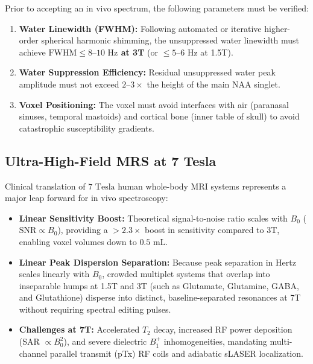 \documentclass[11pt,a4paper]{article}
\begin{document}
\begin{protocolbox}
Prior to accepting an in vivo spectrum, the following parameters must be verified:
\begin{enumerate}
    \item \textbf{Water Linewidth (FWHM):} Following automated or iterative higher-order spherical harmonic shimming, the unsuppressed water linewidth must achieve \textbf{$\text{FWHM} \le 8\text{--}10\text{ Hz}$ at 3T} (or $\le 5\text{--}6\text{ Hz}$ at 1.5T).
    \item \textbf{Water Suppression Efficiency:} Residual unsuppressed water peak amplitude must not exceed $2\text{--}3\times$ the height of the main NAA singlet.
    \item \textbf{Voxel Positioning:} The voxel must avoid interfaces with air (paranasal sinuses, temporal mastoids) and cortical bone (inner table of skull) to avoid catastrophic susceptibility gradients.
\end{enumerate}
\end{protocolbox}

\subsection{Ultra-High-Field MRS at 7 Tesla}
Clinical translation of $7\text{ Tesla}$ human whole-body MRI systems represents a major leap forward for in vivo spectroscopy:
\begin{itemize}[leftmargin=2em]
    \item \textbf{Linear Sensitivity Boost:} Theoretical signal-to-noise ratio scales with $B_0$ ($\text{SNR} \propto B_0$), providing a $> 2.3\times$ boost in sensitivity compared to 3T, enabling voxel volumes down to $0.5\text{ mL}$.
    \item \textbf{Linear Peak Dispersion Separation:} Because peak separation in Hertz scales linearly with $B_0$, crowded multiplet systems that overlap into inseparable humps at 1.5T and 3T (such as Glutamate, Glutamine, GABA, and Glutathione) disperse into distinct, baseline-separated resonances at 7T without requiring spectral editing pulses.
    \item \textbf{Challenges at 7T:} Accelerated $T_2$ decay, increased RF power deposition (SAR $\propto B_0^2$), and severe dielectric $B_1^+$ inhomogeneities, mandating multi-channel parallel transmit (pTx) RF coils and adiabatic sLASER localization.
\end{itemize}
\end{document}
